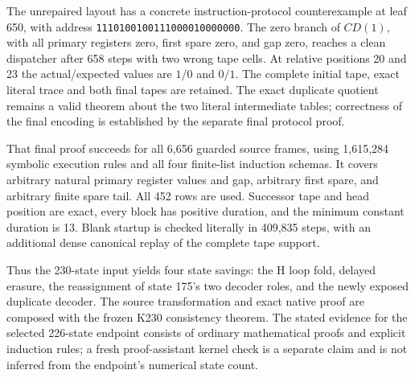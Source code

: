 The unrepaired layout has a concrete instruction-protocol counterexample at
leaf 650, with address
\texttt{1110100100111000010000000}.  The zero branch of $CD(1)$, with all primary
registers zero, first spare zero, and gap zero, reaches a clean dispatcher after
658 steps with two wrong tape cells.  At relative positions 20 and 23 the
actual/expected values are $1/0$ and $0/1$.  The complete initial tape, exact
literal trace and both final tapes are retained.  The exact duplicate quotient
remains a valid theorem about the two literal intermediate tables; correctness
of the final encoding is established by the separate final protocol proof.

That final proof succeeds for all 6,656 guarded source frames, using 1,615,284
symbolic execution rules and all four finite-list induction schemas.  It
covers arbitrary natural primary register values and gap, arbitrary first
spare, and arbitrary finite spare tail.  All 452 rows are used.  Successor tape
and head position are exact, every block has positive duration, and the minimum
constant duration is 13.  Blank startup is checked literally in 409,835 steps,
with an additional dense canonical replay of the complete tape support.

Thus the 230-state input yields four state savings: the H loop fold, delayed
erasure, the reassignment of state 175's two decoder roles, and the newly
exposed duplicate decoder.  The source transformation and exact native proof
are composed with the frozen K230 consistency theorem.  The stated evidence
for the selected 226-state endpoint consists of ordinary mathematical proofs
and explicit induction rules; a fresh proof-assistant kernel check is a
separate claim and is not inferred from the endpoint's numerical state count.
